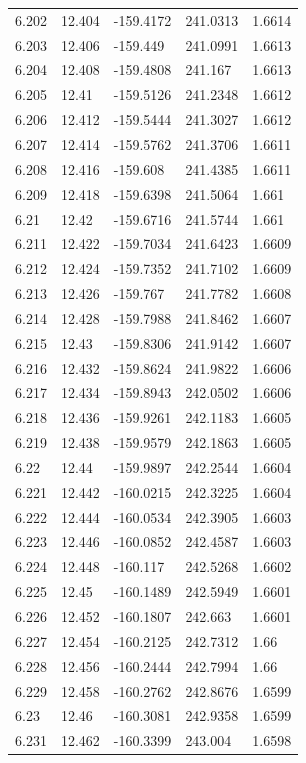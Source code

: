 \begin{tabular}{lllll}
6.202 & 12.404 & -159.4172 & 241.0313 & 1.6614 \\
6.203 & 12.406 & -159.449 & 241.0991 & 1.6613 \\
6.204 & 12.408 & -159.4808 & 241.167 & 1.6613 \\
6.205 & 12.41 & -159.5126 & 241.2348 & 1.6612 \\
6.206 & 12.412 & -159.5444 & 241.3027 & 1.6612 \\
6.207 & 12.414 & -159.5762 & 241.3706 & 1.6611 \\
6.208 & 12.416 & -159.608 & 241.4385 & 1.6611 \\
6.209 & 12.418 & -159.6398 & 241.5064 & 1.661 \\
6.21 & 12.42 & -159.6716 & 241.5744 & 1.661 \\
6.211 & 12.422 & -159.7034 & 241.6423 & 1.6609 \\
6.212 & 12.424 & -159.7352 & 241.7102 & 1.6609 \\
6.213 & 12.426 & -159.767 & 241.7782 & 1.6608 \\
6.214 & 12.428 & -159.7988 & 241.8462 & 1.6607 \\
6.215 & 12.43 & -159.8306 & 241.9142 & 1.6607 \\
6.216 & 12.432 & -159.8624 & 241.9822 & 1.6606 \\
6.217 & 12.434 & -159.8943 & 242.0502 & 1.6606 \\
6.218 & 12.436 & -159.9261 & 242.1183 & 1.6605 \\
6.219 & 12.438 & -159.9579 & 242.1863 & 1.6605 \\
6.22 & 12.44 & -159.9897 & 242.2544 & 1.6604 \\
6.221 & 12.442 & -160.0215 & 242.3225 & 1.6604 \\
6.222 & 12.444 & -160.0534 & 242.3905 & 1.6603 \\
6.223 & 12.446 & -160.0852 & 242.4587 & 1.6603 \\
6.224 & 12.448 & -160.117 & 242.5268 & 1.6602 \\
6.225 & 12.45 & -160.1489 & 242.5949 & 1.6601 \\
6.226 & 12.452 & -160.1807 & 242.663 & 1.6601 \\
6.227 & 12.454 & -160.2125 & 242.7312 & 1.66 \\
6.228 & 12.456 & -160.2444 & 242.7994 & 1.66 \\
6.229 & 12.458 & -160.2762 & 242.8676 & 1.6599 \\
6.23 & 12.46 & -160.3081 & 242.9358 & 1.6599 \\
6.231 & 12.462 & -160.3399 & 243.004 & 1.6598 \\

\end{tabular}
